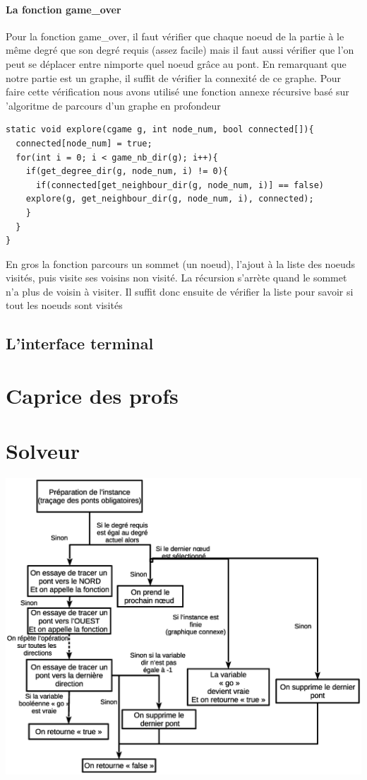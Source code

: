 \documentclass[12pt]{report}
\begin{document}
\subsubsection{La fonction game\_over}
\textnormal{Pour la fonction game\_over, il faut vérifier que chaque noeud de la partie à le même degré que son degré requis (assez facile) mais il faut aussi vérifier que l'on peut se déplacer entre nimporte quel noeud grâce au pont. En remarquant que notre partie est un graphe, il suffit de vérifier la connexité de ce graphe. Pour faire cette vérification nous avons utilisé une fonction annexe récursive basé sur 'algoritme de parcours d'un graphe en profondeur}
\begin{verbatim}
static void explore(cgame g, int node_num, bool connected[]){
  connected[node_num] = true;
  for(int i = 0; i < game_nb_dir(g); i++){
    if(get_degree_dir(g, node_num, i) != 0){
      if(connected[get_neighbour_dir(g, node_num, i)] == false)
	explore(g, get_neighbour_dir(g, node_num, i), connected);
    }
  }   
}
\end{verbatim}
\textnormal{En gros la fonction parcours un sommet (un noeud), l'ajout à la liste des noeuds visités, puis visite ses voisins non visité. La récursion s'arrète quand le sommet n'a plus de voisin à visiter. Il suffit donc ensuite de vérifier la liste pour savoir si tout les noeuds sont visités}
\section{L'interface terminal}

\chapter{Caprice des profs}

\chapter{Solveur}
\includegraphics[width = 1.00\textwidth]{explication_solveur.eps}
\end{document}
